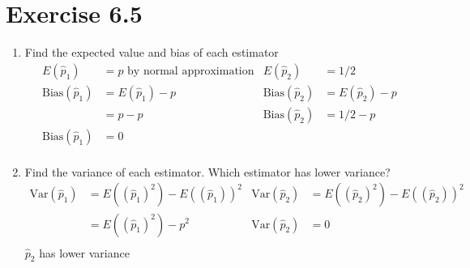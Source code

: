 \documentclass{article}
\newcommand{\var}{\text{Var}}
\newcommand{\bias}{\text{Bias}}
\begin{document}
\section*{Exercise 6.5}
\begin{enumerate}[\quad(a)]
	\item Find the expected value and bias of each estimator
	\begin{align*}
		E(\hat{p}_1) &= p \text{ by normal approximation} &
			E(\hat{p}_2) &= 1/2\\
		\bias(\hat{p}_1)  &= E(\hat{p}_1) - p &
			\bias(\hat{p}_2)  &= E(\hat{p}_2) - p \\
		&= p - p &
			\bias(\hat{p}_2)  &= 1/2 - p\\
		\bias(\hat{p}_1)  &= 0\\
	\end{align*}
	\item Find the variance of each estimator. Which estimator has lower variance?
	\begin{align*}
		\var(\hat{p}_1) &= E((\hat{p}_1)^2) - E((\hat{p}_1))^2 &
			\var(\hat{p}_2) &= E((\hat{p}_2)^2) - E((\hat{p}_2))^2 \\
		&= E((\hat{p}_1)^2) - p^2 &
			\var(\hat{p}_2) &= 0 \\
	\end{align*}
	$\hat{p}_2$ has lower variance
\end{enumerate}
\end{document}
